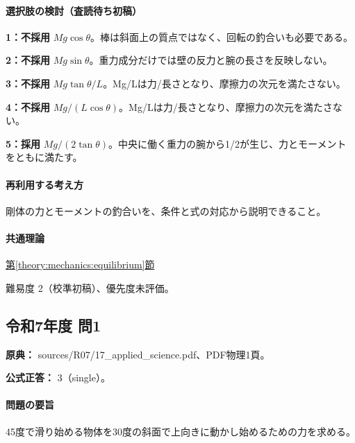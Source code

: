 \paragraph{選択肢の検討（査読待ち初稿）}\mbox{}\par

\noindent\textbf{1：不採用} \(Mg\cos\theta\)。棒は斜面上の質点ではなく、回転の釣合いも必要である。\par

\noindent\textbf{2：不採用} \(Mg\sin\theta\)。重力成分だけでは壁の反力と腕の長さを反映しない。\par

\noindent\textbf{3：不採用} \(Mg\tan\theta/L\)。Mg/Lは力/長さとなり、摩擦力の次元を満たさない。\par

\noindent\textbf{4：不採用} \(Mg/(L\cos\theta)\)。Mg/Lは力/長さとなり、摩擦力の次元を満たさない。\par

\noindent\textbf{5：採用} \(Mg/(2\tan\theta)\)。中央に働く重力の腕から1/2が生じ、力とモーメントをともに満たす。\par

\paragraph{再利用する考え方} 剛体の力とモーメントの釣合いを、条件と式の対応から説明できること。

\paragraph{共通理論} \hyperref[theory:mechanics:equilibrium]{第\ref*{theory:mechanics:equilibrium}節}

\par 難易度 2（校準初稿）、優先度未評価。

\subsection{令和7年度 問1}
\label{q:r07-reg-applied-01}

\noindent\textbf{原典：} sources/R07/17\_applied\_science.pdf、PDF物理1頁。

\textbf{公式正答：} 3（single）。

\paragraph{問題の要旨} 45度で滑り始める物体を30度の斜面で上向きに動かし始めるための力を求める。

